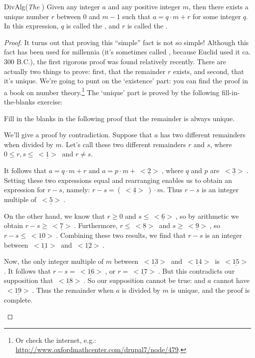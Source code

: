 \begin{prop}{DivAlg}(\emph{The }  )  
Given any integer $a$ and any positive integer $m$, then there exists  a unique number $r$ between $0$ and $m-1$ such that  $a = q \cdot m + r$ for some integer $q$. In this expression, $q$  is called the  , and $r$ is called the .  
\end{prop}

\begin{proof}
It turns out that proving this ``simple'' fact is not so simple! Although this fact has been used for millennia (it's sometimes called , because Euclid used it ca. 300 B.C.), the first rigorous proof was found relatively recently.  There are actually two things to prove: first, that the remainder $r$  exists, and second, that it's unique. We're going to punt on the `existence' part: you can find the proof in a book on number theory.\footnote{Or check the internet, e.g.:  \url{http://www.oxfordmathcenter.com/drupal7/node/479}.}
The `unique' part is proved by the following fill-in-the-blanks exercise:

\begin{exercise}{27} 
Fill in the blanks in the following proof that the remainder is always unique.

\noindent
We'll give a proof by contradiction. Suppose that $a$ has two different remainders when divided by $m$.  Let's call these two different remainders $r$ and $s$, where $0 \le r,s \le \underline{~<1>~}$ and $r \neq s$.

It follows that $a = q \cdot m + r$ and $a = p \cdot m + \underline{~<2>~}$, where $q$ and  $p$ are $\underline{~<3>~}$. Setting these two expressions equal and rearranging enables us to obtain an expression for $r-s$, namely:
$r - s = (\underline{~<4>~})\cdot m$. Thus $r-s$ is an integer multiple of $\underline{~<5>~}$.

On the other hand, we  know that $r \ge 0$ and $s \le \underline{~<6>~}$, so by arithmetic we obtain $r - s \ge \underline{~<7>~}$.
Furthermore, $r \le \underline{~<8>~}$ and $s \ge \underline{~<9>~}$, so $r - s \le \underline{~<10>~}$. Combining these two results, we find
that $r-s$ is an integer between $\underline{~<11>~}$ and $\underline{~<12>~}$.

Now, the only integer multiple of $m$ between $\underline{~<13>~}$ and $\underline{~<14>~}$ is  $\underline{~<15>~}$.  It follows that $r - s = \underline{~<16>~}$,
or $r = \underline{~<17>~}$. But this contradicts our supposition that $\underline{~<18>~}$. So our supposition cannot be true: and $a$ cannot have $\underline{~<19>~}$.
Thus the remainder when $a$ is divided by $m$ is unique, and the proof is complete.
\end{exercise}
\end{proof}

